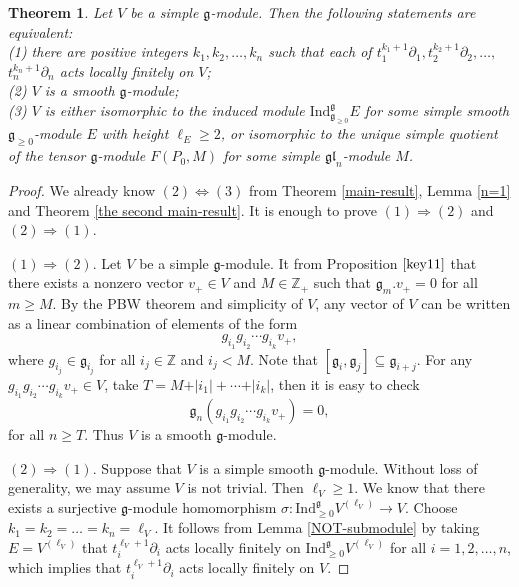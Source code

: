 \documentclass[12pt, a4paper]{amsart}
\newcommand{\fg}{\mathfrak g}
\def\gl{\mathfrak{gl}}
\theoremstyle{Theorem}
\theoremstyle{Theorem}
\newtheorem{thm}{Theorem}[section]
\numberwithin{equation}{section}
\begin{document}
\begin{thm}\label{thmmain}
	Let $V$ be a simple $\fg$-module. Then the following statements are equivalent:\\
	(1) there are positive integers $k_1,k_2,\dots,k_{n}$ such that
	each of $t_{1}^{k_{1}+1}\partial_{1},t_{2}^{k_{2}+1}\partial_{2},\dots,$ $t_{n}^{k_{n}+1}\partial_{n}$
	acts locally finitely on $V$;\\
	(2) $V$ is a smooth $\fg$-module;\\
	(3) $V$ is either isomorphic to the induced module $\mathrm{Ind}_{\fg_{\geq0}}^{\fg}E$ for some simple smooth $\fg_{\geq0}$-module $E$ with height $\ell_{E}\geq2$, or isomorphic to the unique simple quotient of the tensor $\fg$-module $F(P_{0},M)$ for some simple $\gl_{n}$-module $M$.
\end{thm}
\begin{proof}
	We already know	$(2) \Longleftrightarrow (3)$ from Theorem \ref{main-result}, Lemma \ref{n=1} and Theorem \ref{the second main-result}. It is enough to prove $(1) \Rightarrow(2)$ and $(2) \Rightarrow(1)$.
	
	
	$(1)\Rightarrow(2)$. 
		Let $V$ be a simple $\fg$-module. It from Proposition $\ref{key11}$ that there exists a nonzero vector $v_+\in V$ and $M\in\mathbb{Z}_{+}$ such that $\fg_m.v_+= 0$ for all $m\geq M$.	By the PBW theorem and simplicity of $V$, any vector of $V$ can be written as a linear combination of elements of the form $$g_{i_{1}}g_{i_{2}}\cdots g_{i_{k}}v_+,$$
		where $g_{i_j}\in\fg_{i_j}$ for all $i_j\in\mathbb{Z}$ and $i_j<M$. Note that $[\fg_{i},\fg_{j}]\subseteq\fg_{i + j}$. For any $g_{i_{1}}g_{i_{2}}\cdots g_{i_{k}}v_+\in V$, take $T = M+\vert i_{1}\vert+\cdots+\vert i_{k}\vert$, then it is easy to check $$\fg_{n}(g_{i_{1}}g_{i_{2}}\cdots g_{i_{k}}v_+)=0,$$
		for all $n\geq T$. Thus $V$ is a smooth $\fg$-module.
		
	$(2) \Rightarrow(1)$. Suppose that $V$ is a simple smooth $\fg$-module. Without loss of generality, we may assume $V$ is not trivial. Then $\ell_{V}\geq1$. We know that there exists a surjective $\fg$-module homomorphism $\sigma:\mathrm{Ind}_{\geq0}^{\fg}V^{(\ell_{V})}\rightarrow V$. Choose $k_{1}=k_{2}=\dots=k_{n}=\ell_{V}$. It follows from Lemma \ref{NOT-submodule} by taking $E=V^{(\ell_V)}$ that $t_{i}^{\ell_{V}+1}\partial_{i}$ acts locally finitely on $\mathrm{Ind}_{\geq0}^{\fg}V^{(\ell_{V})}$ for all $i=1,2,\dots,n$, which implies that $t_{i}^{\ell_{V}+1}\partial_{i}$ acts locally finitely on $V$.
\end{proof}
\end{document}
